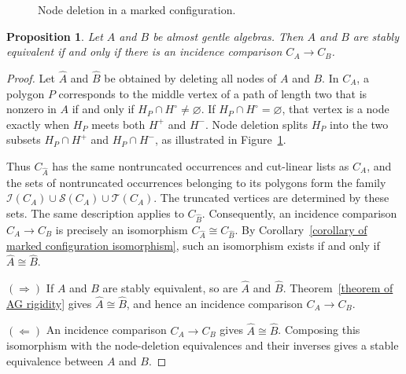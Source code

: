\documentclass[11pt]{article}
\newcommand{\vv}{\mathsf{v}}
\newcommand{\ww}{\mathsf{w}}
\newtheorem{proposition}[theorem]{Proposition}
\theoremstyle{definition}
\begin{document}
\begin{figure}[htbp]
			\caption{Node deletion in a marked configuration.}
			\label{figure of configuration node deletion}
		\end{figure}

		\begin{proposition}\label{proposition of configuration stable criterion}
			Let $A$ and $B$ be almost gentle algebras. Then $A$ and $B$ are stably equivalent if and only if there is an incidence comparison $C_A\to C_B$.
		\end{proposition}

		\begin{proof}
			Let $\widehat A$ and $\widehat B$ be obtained by deleting all nodes of $A$ and $B$.
			In $C_A$, a polygon $P$ corresponds to the middle vertex of a path of length two that is nonzero in $A$ if and only if $H_P\cap H^\circ\ne\varnothing$.
			If $H_P\cap H^\circ=\varnothing$, that vertex is a node exactly when $H_P$ meets both $H^+$ and $H^-$. Node deletion splits $H_P$ into the two subsets $H_P\cap H^+$ and $H_P\cap H^-$, as illustrated in Figure~\ref{figure of configuration node deletion}.

			Thus $C_{\widehat A}$ has the same nontruncated occurrences and cut-linear lists as $C_A$, and the sets of nontruncated occurrences belonging to its polygons form the family $\mathscr I(C_A)\cup\mathscr S(C_A)\cup\mathscr T(C_A)$. The truncated vertices are determined by these sets.
			The same description applies to $C_{\widehat B}$. Consequently, an incidence comparison $C_A\to C_B$ is precisely an isomorphism $C_{\widehat A}\cong C_{\widehat B}$. By Corollary~\ref{corollary of marked configuration isomorphism}, such an isomorphism exists if and only if $\widehat A\cong\widehat B$.

			\noindent\underline{$(\Rightarrow)$}
			If $A$ and $B$ are stably equivalent, so are $\widehat A$ and $\widehat B$. Theorem~\ref{theorem of AG rigidity} gives $\widehat A\cong\widehat B$, and hence an incidence comparison $C_A\to C_B$.

			\noindent\underline{$(\Leftarrow)$}
			An incidence comparison $C_A\to C_B$ gives $\widehat A\cong\widehat B$. Composing this isomorphism with the node-deletion equivalences and their inverses gives a stable equivalence between $A$ and $B$.
		\end{proof}
\end{document}
